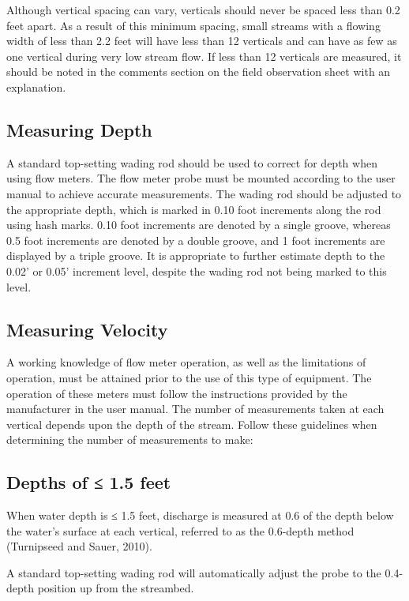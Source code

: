 \documentclass[12pt]{../SOP3_beta}\usepackage[]{graphicx}\usepackage[]{xcolor}
\begin{document}
\NP Although vertical spacing can vary, verticals should never be spaced less than 0.2 feet
apart. As a result of this minimum spacing, small streams with a flowing width of less
than 2.2 feet will have less than 12 verticals and can have as few as one vertical during
very low stream flow. If less than 12 verticals are measured, it should be noted in the
comments section on the field observation sheet with an explanation.

\subsection{Measuring Depth}

A standard top-setting wading rod should be used to correct for depth when using flow
meters. The flow meter probe must be mounted according to the user manual to
achieve accurate measurements. The wading rod should be adjusted to the appropriate
depth, which is marked in 0.10 foot increments along the rod using hash marks. 0.10
foot increments are denoted by a single groove, whereas 0.5 foot increments are
denoted by a double groove, and 1 foot increments are displayed by a triple groove. It
is appropriate to further estimate depth to the 0.02’ or 0.05’ increment level, despite
the wading rod not being marked to this level.

\subsection{Measuring Velocity}

A working knowledge of flow meter operation, as well as the limitations of operation,
must be attained prior to the use of this type of equipment. The operation of these
meters must follow the instructions provided by the manufacturer in the user manual.
The number of measurements taken at each vertical depends upon the depth of the
stream. Follow these guidelines when determining the number of measurements to
make:

\subsection{Depths of ≤ 1.5 feet}

\NP When water depth is ≤ 1.5 feet, discharge is measured at 0.6 of the depth below the
water’s surface at each vertical, referred to as the 0.6-depth method (Turnipseed and
Sauer, 2010). 

\NP A standard top-setting wading rod will automatically adjust the probe to
the 0.4-depth position up from the streambed.
\end{document}
